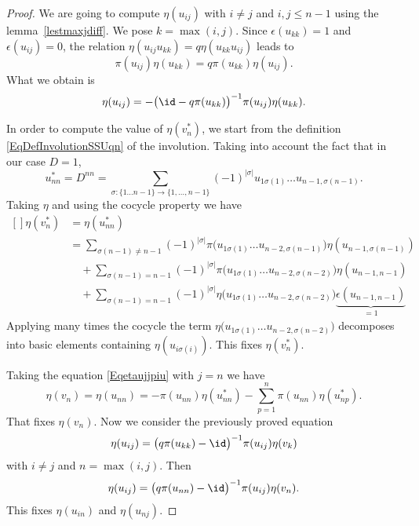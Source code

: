 \begin{proof}
    We are going to compute $\eta(u_{ij})$ with $i\neq j$ and $i,j\leq n-1$ using the lemma~\ref{lestmaxjdiff}. We pose $k=\max(i,j)$. Since $\epsilon(u_{kk})=1$ and $\epsilon(u_{ij})=0$, the relation $\eta(u_{ij}u_{kk})=q\eta(u_{kk}u_{ij})$ leads to
    \begin{equation}
        \pi(u_{ij})\eta(u_{kk})=q\pi(u_{kk})\eta(u_{ij}).
    \end{equation}
    What we obtain is
    \begin{equation}
        \eta(u_{ij})=-\big( \id-q\pi(u_{kk}) \big)^{-1}\pi(u_{ij})\eta(u_{kk}).
    \end{equation}

    In order to compute the value of $\eta(v_n^*)$, we start from the definition \eqref{EqDefInvolutionSSUqn} of the involution. Taking into account the fact that in our case $D=1$,
    \begin{equation}
        u_{nn}^*=D^{nn}=\sum_{\sigma\colon \{ 1\ldots n-1 \}\to \{ 1,\ldots,n-1 \}}(-1)^{| \sigma |}u_{1\sigma(1)}\ldots u_{n-1,\sigma(n-1)}.
    \end{equation}
    Taking $\eta$ and using the cocycle property we have
    \begin{equation}
        \begin{aligned}[]
            \eta(v_n^*)&=\eta(u_{nn}^*)\\
            &=\sum_{\sigma(n-1)\neq n-1}(-1)^{| \sigma |}\pi\big( u_{1\sigma(1)}\ldots u_{n-2,\sigma(n-1)} \big)\eta(u_{n-1,\sigma(n-1)})\\
            &\quad+\sum_{\sigma(n-1)=n-1}(-1)^{| \sigma |}\pi\big( u_{1\sigma(1)}\ldots u_{n-2,\sigma(n-2)} \big)\eta(u_{n-1,n-1})\\
            &\quad+\sum_{\sigma(n-1)=n-1}(-1)^{| \sigma |}\eta\big( u_{1\sigma(1)}\ldots u_{n-2,\sigma(n-2)} \big)\underbrace{\epsilon(u_{n-1,n-1})}_{=1}
        \end{aligned}
    \end{equation}
    Applying many times the cocycle the term $\eta\big( u_{1\sigma(1)}\ldots u_{n-2,\sigma(n-2)} \big)$ decomposes into basic elements containing $\eta(u_{i\sigma(i)})$. This fixes $\eta(v_n^*)$.

    Taking the equation \eqref{Eqetaujjpiu} with $j=n$ we have
    \begin{equation}
        \eta(v_n)=\eta(u_{nn})=-\pi(u_{nn})\eta(u_{nn}^*)-\sum_{p=1}^n\pi(u_{nn})\eta(u_{np}^*).
    \end{equation}
    That fixes $\eta(v_n)$. Now we consider the previously proved equation
    \begin{equation}
        \eta(u_{ij})=\big( q\pi(u_{kk})-\id \big)^{-1}\pi(u_{ij})\eta(v_k)
    \end{equation}
    with $i\neq j$ and $n=\max(i,j)$. Then
    \begin{equation}
        \eta(u_{ij})=\big( q\pi(u_{nn})-\id \big)^{-1}\pi(u_{ij})\eta(v_n).
    \end{equation}
    This fixes $\eta(u_{in})$ and $\eta(u_{nj})$.

\end{proof}


